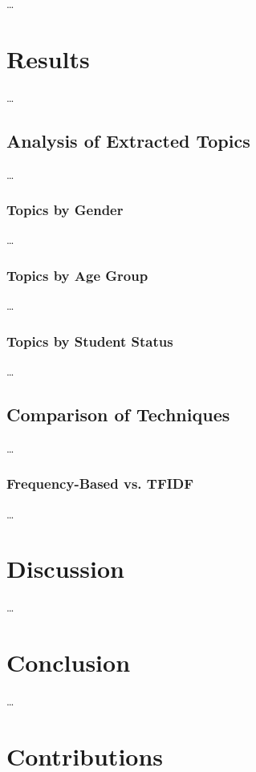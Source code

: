 \documentclass[conference,a4paper]{IEEEtran}
\begin{document}
\dots


\section{Results}

\dots

\subsection{Analysis of Extracted Topics}

\dots

\subsubsection{Topics by Gender}

\dots

\subsubsection{Topics by Age Group}

\dots

\subsubsection{Topics by Student Status}

\dots

\subsection{Comparison of Techniques}

\dots

\subsubsection{Frequency-Based vs. TFIDF}

\dots

\section{Discussion}

\dots

\section{Conclusion}

\dots

\section{Contributions}
\end{document}
